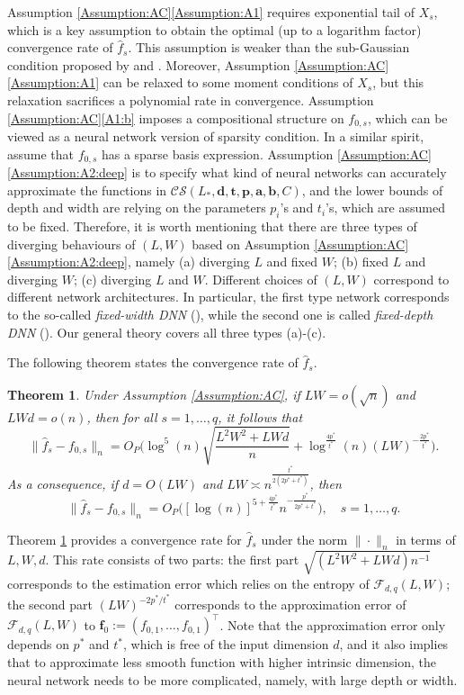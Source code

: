 \documentclass[11pt, preprint]{imsart}
\numberwithin{equation}{section}
\def \mcF{\mathcal{F}}
\def \mcCS{\mathcal{C}\mathcal{S}}
\def \bfd{\mathbf{d}}
\def \bft{\mathbf{t}}
\def \bfp{\mathbf{p}}
\def \bfa{\mathbf{a}}
\def \bfb{\mathbf{b}}
\def \bff{\mathbf{f}}
\def \bfa{\mathbf{a}}
\def \bfb{\mathbf{b}}
\def \bff{\mathbf{f}}
\def \bft{\mathbf{t}}
\theoremstyle{plain}
\newtheorem{theorem}{\indent Theorem}
\theoremstyle{definition}
\begin{document}
Assumption \ref{Assumption:AC}\ref{Assumption:A1} requires exponential tail of $X_s$, which is a key assumption to obtain the optimal (up to a logarithm factor) convergence rate of $\widehat{f}_s$. This assumption is weaker than the sub-Gaussian condition proposed by \cite{bk19} and \cite{s19}. Moreover, Assumption \ref{Assumption:AC}\ref{Assumption:A1} can be relaxed to some moment conditions of $X_s$, but this relaxation sacrifices a polynomial rate in convergence. Assumption \ref{Assumption:AC}\ref{A1:b} imposes a compositional structure on $f_{0,s}$, which can be viewed as a neural network version of sparsity condition. In a similar spirit, \cite{bcch12} assume that $f_{0,s}$ has a sparse basis expression. Assumption \ref{Assumption:AC}\ref{Assumption:A2:deep} is to specify what kind of neural networks can accurately approximate the functions in $\mcCS(L_*, \bfd, \bft, \bfp,\bfa, \bfb, C)$, and the lower bounds of depth and width are relying on the parameters $p_i$'s and $t_i$'s, {which are assumed to be fixed}. Therefore, it is worth mentioning that there are three types of diverging behaviours of $(L, W)$ {based on Assumption \ref{Assumption:AC}\ref{Assumption:A2:deep}}, namely (a) diverging $L$ and fixed $W$; (b) fixed $L$ and diverging $W$; (c) diverging $L$ and $W$. Different choices of $(L, W)$ correspond to different network architectures. In particular, the first type network corresponds to the so-called  \textit{fixed-width DNN} (\citealp{mk19}), while the second one is called  \textit{fixed-depth DNN} (\citealp{bk19}). Our general theory covers all three types (a)-(c).

The following theorem states the convergence rate of $\widehat{f}_s$.
\begin{theorem}\label{theorem:rate:deep}
Under Assumption \ref{Assumption:AC}, if $LW=o(\sqrt{n})$ and $LWd=o(n)$, then for all $s=1,\ldots, q$, it follows that
\begin{equation*}
	\|\widehat{f}_s-f_{0,s}\|_n=O_P\bigg(\log^5(n)\sqrt{\frac{L^2W^2+LWd}{n}}+\log^{\frac{4p^*}{t^*}}(n)(LW)^{-\frac{2p^*}{t^*}}\bigg).
\end{equation*}
As a consequence, if $d=O(LW)$ and $LW\asymp n^{\frac{t^*}{2(2p^*+t^*)}}$, then
\begin{equation*}
	\|\widehat{f}_s-f_{0,s}\|_n=O_P\bigg([\log(n)]^{5+\frac{4p^*}{t^*}}n^{-\frac{p^*}{2p^*+t^*}}\bigg),\quad s=1,\ldots, q.
\end{equation*}
\end{theorem}
Theorem \ref{theorem:rate:deep} provides a convergence rate for $\widehat{f}_s$ under the norm $\|\cdot\|_n$ in terms of $L,W,d$. This rate consists of two parts: the first part $\sqrt{(L^2W^2+LWd)n^{-1}}$ corresponds to the estimation error which relies on the entropy of $\mcF_{d, q}(L, W)$; the second part $(LW)^{-2p^*/t^*}$ corresponds to the approximation error of $\mcF_{d,q}(L, W)$ to $\bff_0:=(f_{0,1},\ldots, f_{0,1})^\top$. Note that the approximation error only depends on $p^*$ and $t^*$, which is free of the input dimension $d$, and it also implies that to approximate less smooth function with higher intrinsic dimension, the neural network needs to be more complicated, namely, with large depth or width. 
\end{document}
